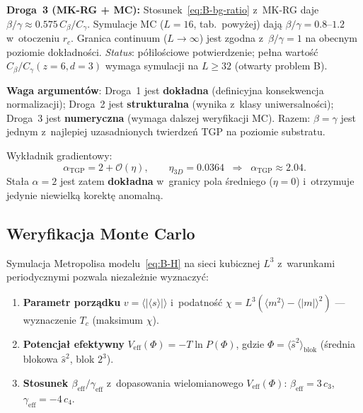 \begin{theorem}[Trzy niezale\.zne drogi do $\beta = \gamma$]
\medskip\noindent
\textbf{Droga~3 (MK-RG + MC):}
Stosunek~\eqref{eq:B-bg-ratio} z~MK-RG daje $\beta/\gamma \approx 0.575\,C_\beta/C_\gamma$.
Symulacje MC ($L = 16$, tab.~powy\.zej) daj\k{a} $\beta/\gamma = 0.8$--$1.2$
w~otoczeniu $r_c$. Granica continuum ($L \to \infty$) jest zgodna
z~$\beta/\gamma = 1$ na obecnym poziomie dok\l{}adno\'sci.
\emph{Status}: p\'o\l{}ilo\'sciowe potwierdzenie;
pe\l{}na warto\'s\'c $C_\beta/C_\gamma(z{=}6, d{=}3)$
wymaga symulacji na $L \geq 32$ (otwarty problem B).

\medskip\noindent
\textbf{Waga argument\'ow}:
Droga~1 jest \textbf{dok\l{}adna} (definicyjna konsekwencja normalizacji);
Droga~2 jest \textbf{strukturalna} (wynika z~klasy uniwersalno\'sci);
Droga~3 jest \textbf{numeryczna} (wymaga dalszej weryfikacji MC).
Razem: $\beta = \gamma$ jest jednym z~najlepiej uzasadnionych
twierdze\'n TGP na poziomie substratu.
\end{theorem}

Wyk\l{}adnik gradientowy:
\begin{equation}\label{eq:B-alpha-eff}
  \alpha_{\mathrm{TGP}} = 2 + \mathcal{O}(\eta), \qquad
  \eta_{3D} = 0.0364 \;\;\Rightarrow\;\;
  \alpha_{\mathrm{TGP}} \approx 2.04.
\end{equation}
Sta\l{}a $\alpha = 2$ jest zatem \textbf{dok\l{}adna}
w~granicy pola \'sredniego ($\eta = 0$) i~otrzymuje
jedynie niewielk\k{a} korekt\k{e} anomaln\k{a}.

\subsection{Weryfikacja Monte Carlo}\label{app:B-MC}

Symulacja Metropolisa modelu~\eqref{eq:B-H} na sieci kubicznej
$L^3$ z~warunkami periodycznymi pozwala niezale\.znie wyznaczy\'c:

\begin{enumerate}[nosep]
  \item \textbf{Parametr porz\k{a}dku} $v = \langle|\langle s\rangle|\rangle$
    i~podatno\'s\'c $\chi = L^3(\langle m^2\rangle - \langle|m|\rangle^2)$
    --- wyznaczenie $T_c$ (maksimum $\chi$).
  \item \textbf{Potencja\l{} efektywny}
    $V_{\mathrm{eff}}(\Phi) = -T\ln P(\Phi)$,
    gdzie $\Phi = \langle\hat{s}^2\rangle_{\mathrm{blok}}$
    (\'srednia blokowa $\hat{s}^2$, blok $2^3$).
  \item \textbf{Stosunek $\beta_{\mathrm{eff}}/\gamma_{\mathrm{eff}}$}
    z~dopasowania wielomianowego $V_{\mathrm{eff}}(\Phi)$:
    $\beta_{\mathrm{eff}} = 3\,c_3$, $\gamma_{\mathrm{eff}} = -4\,c_4$.
\end{enumerate}

